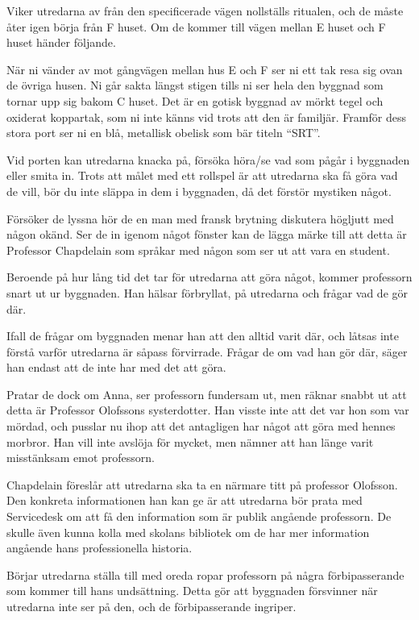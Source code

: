 %
Viker utredarna av från den specificerade vägen nollställs ritualen, och de måste åter igen börja från F huset. Om de kommer till vägen mellan E huset och F huset händer följande.
%
\begin{displayquote}
	När ni vänder av mot gångvägen mellan hus E och F ser ni ett tak resa sig ovan de övriga husen. Ni går sakta längst stigen tills ni ser hela den byggnad som tornar upp sig bakom C huset. Det är en gotisk byggnad av mörkt tegel och oxiderat koppartak, som ni inte känns vid trots att den är familjär. Framför dess stora port ser ni en blå, metallisk obelisk som bär titeln ``SRT''.
\end{displayquote}

Vid porten kan utredarna knacka på, försöka höra/se vad som pågår i byggnaden eller smita in. Trots att målet med ett rollspel är att utredarna ska få göra vad de vill, bör du inte släppa in dem i byggnaden, då det förstör mystiken något.

Försöker de lyssna hör de en man med fransk brytning diskutera högljutt med någon okänd. Ser de in igenom något fönster kan de lägga märke till att detta är Professor Chapdelain \sectiondescribe{\ref{kar:MigelChapdelain}} som språkar med någon som ser ut att vara en student.

Beroende på hur lång tid det tar för utredarna att göra något, kommer professorn snart ut ur byggnaden. Han hälsar förbryllat, på utredarna och frågar vad de gör där.

Ifall de frågar om byggnaden menar han att den alltid varit där, och låtsas inte förstå varför utredarna är såpass förvirrade. Frågar de om vad han gör där, säger han endast att de inte har med det att göra.

Pratar de dock om Anna, ser professorn fundersam ut, men räknar snabbt ut att detta är Professor Olofssons systerdotter. Han visste inte att det var hon som var mördad, och pusslar nu ihop att det antagligen har något att göra med hennes morbror. Han vill inte avslöja för mycket, men nämner att han länge varit misstänksam emot professorn.

Chapdelain föreslår att utredarna ska ta en närmare titt på professor Olofsson. Den konkreta informationen han kan ge är att utredarna bör prata med Servicedesk om att få den information som är publik angående professorn. De skulle även kunna kolla med skolans bibliotek om de har mer information angående hans professionella historia.

Börjar utredarna ställa till med oreda ropar professorn på några förbipasserande som kommer till hans undsättning. Detta gör att byggnaden försvinner när utredarna inte ser på den, och de förbipasserande ingriper.
